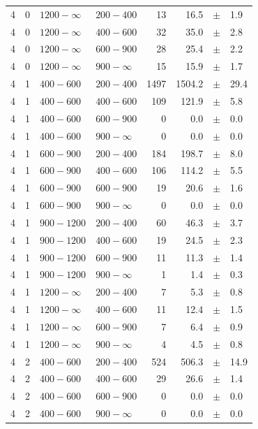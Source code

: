 \begin{table}[!t]
\begin{tabular}{rrllrrcl}
4 & 0 & $1200- \infty$ & $200-400$ &     13 &     16.5 &$\pm$&    1.9 \\
4 & 0 & $1200- \infty$ & $400-600$ &     32 &     35.0 &$\pm$&    2.8 \\
4 & 0 & $1200- \infty$ & $600-900$ &     28 &     25.4 &$\pm$&    2.2 \\
4 & 0 & $1200- \infty$ & $900-\infty$ &     15 &     15.9 &$\pm$&    1.7 \\
4 & 1 & $ 400- 600$ & $200-400$ &   1497 &   1504.2 &$\pm$&   29.4 \\
4 & 1 & $ 400- 600$ & $400-600$ &    109 &    121.9 &$\pm$&    5.8 \\
4 & 1 & $ 400- 600$ & $600-900$ &      0 &      0.0 &$\pm$&    0.0 \\
4 & 1 & $ 400- 600$ & $900-\infty$ &      0 &      0.0 &$\pm$&    0.0 \\
4 & 1 & $ 600- 900$ & $200-400$ &    184 &    198.7 &$\pm$&    8.0 \\
4 & 1 & $ 600- 900$ & $400-600$ &    106 &    114.2 &$\pm$&    5.5 \\
4 & 1 & $ 600- 900$ & $600-900$ &     19 &     20.6 &$\pm$&    1.6 \\
4 & 1 & $ 600- 900$ & $900-\infty$ &      0 &      0.0 &$\pm$&    0.0 \\
4 & 1 & $ 900-1200$ & $200-400$ &     60 &     46.3 &$\pm$&    3.7 \\
4 & 1 & $ 900-1200$ & $400-600$ &     19 &     24.5 &$\pm$&    2.3 \\
4 & 1 & $ 900-1200$ & $600-900$ &     11 &     11.3 &$\pm$&    1.4 \\
4 & 1 & $ 900-1200$ & $900-\infty$ &      1 &      1.4 &$\pm$&    0.3 \\
4 & 1 & $1200- \infty$ & $200-400$ &      7 &      5.3 &$\pm$&    0.8 \\
4 & 1 & $1200- \infty$ & $400-600$ &     11 &     12.4 &$\pm$&    1.5 \\
4 & 1 & $1200- \infty$ & $600-900$ &      7 &      6.4 &$\pm$&    0.9 \\
4 & 1 & $1200- \infty$ & $900-\infty$ &      4 &      4.5 &$\pm$&    0.8 \\
4 & 2 & $ 400- 600$ & $200-400$ &    524 &    506.3 &$\pm$&   14.9 \\
4 & 2 & $ 400- 600$ & $400-600$ &     29 &     26.6 &$\pm$&    1.4 \\
4 & 2 & $ 400- 600$ & $600-900$ &      0 &      0.0 &$\pm$&    0.0 \\
4 & 2 & $ 400- 600$ & $900-\infty$ &      0 &      0.0 &$\pm$&    0.0 \\

\end{tabular}
\end{table}
